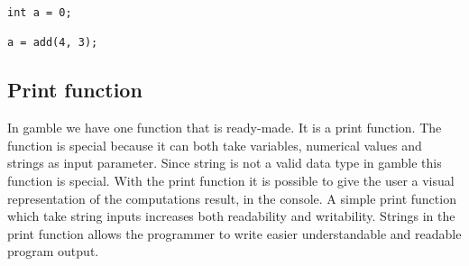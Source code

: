\begin{lstlisting}[caption={Return Function},label={lst:returnFunction}]
int a = 0;

a = add(4, 3);
\end{lstlisting}


\subsection*{Print function}
In \gls{gamble} we have one function that is ready-made. It is a print function.
The function is special because it can both take variables, numerical values and strings as input parameter.
Since string is not a valid data type in \gls{gamble} this function is special. 
With the print function it is possible to give the user a visual representation of the computations result, in the console.
A simple print function which take string inputs increases both readability and writability.
Strings in the print function allows the programmer to write easier understandable and readable program output. 
